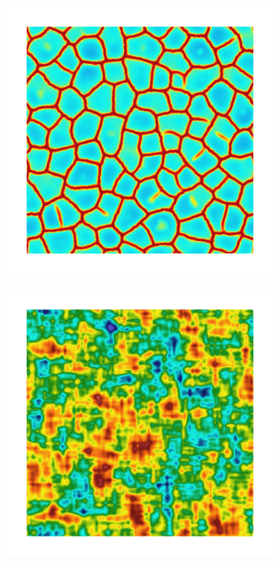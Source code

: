 \begin{figure}[!htb]
\begin{subfigure}[b]{0.15\textwidth}
    \caption{}
    \label{fig: Chapter4/2D/psic_sqexp_cartesian_5_5_rho_0_seed_d}
  \end{subfigure}
  \begin{subfigure}[b]{0.15\textwidth}
    \includegraphics[width=\textwidth]{Chapter4/figures/2D/d_sqexp_cartesian_5_5_rho_0_seed_d.png}
    \caption{}
    \label{fig: Chapter4/2D/d_sqexp_cartesian_5_5_rho_0_seed_d}
  \end{subfigure}
  \begin{subfigure}[b]{0.15\textwidth}
    \includegraphics[width=\textwidth]{Chapter4/figures/2D/Gc_exp_cartesian_5_5_rho_0_seed_d.png}

\end{subfigure}
\end{figure}
